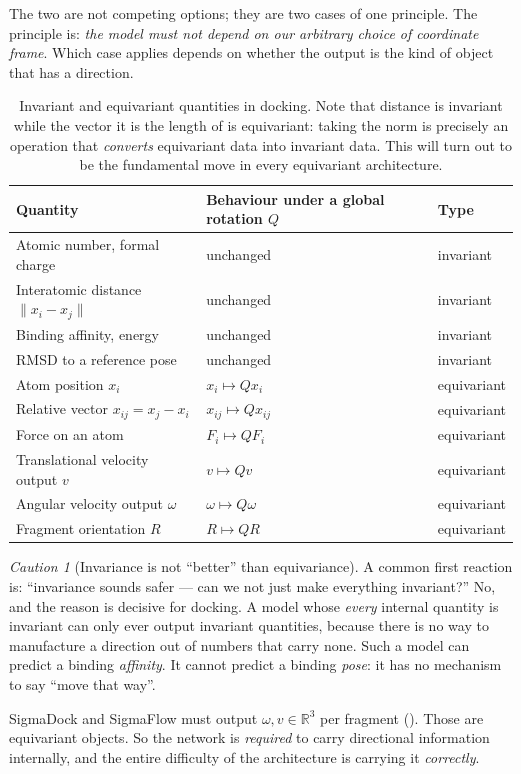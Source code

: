 \documentclass[11pt,a4paper]{report}
\theoremstyle{definition}
\theoremstyle{remark}
\newtheorem{caution}[caution]{Caution}
\newcommand{\RR}{\mathbb R}
\begin{document}
The two are not competing options; they are two cases of one principle. The
principle is: \emph{the model must not depend on our arbitrary choice of
coordinate frame}. Which case applies depends on whether the output is the
kind of object that has a direction.

\begin{table}[h]
\centering
\begin{tabular}{lll}
\toprule
Quantity & Behaviour under a global rotation $Q$ & Type \\
\midrule
Atomic number, formal charge & unchanged & invariant \\
Interatomic distance $\|x_i-x_j\|$ & unchanged & invariant \\
Binding affinity, energy & unchanged & invariant \\
RMSD to a reference pose & unchanged & invariant \\
\midrule
Atom position $x_i$ & $x_i\mapsto Qx_i$ & equivariant \\
Relative vector $x_{ij}=x_j-x_i$ & $x_{ij}\mapsto Qx_{ij}$ & equivariant \\
Force on an atom & $F_i\mapsto QF_i$ & equivariant \\
Translational velocity output $v$ & $v\mapsto Qv$ & equivariant \\
Angular velocity output $\omega$ & $\omega\mapsto Q\omega$ & equivariant \\
Fragment orientation $R$ & $R\mapsto QR$ & equivariant \\
\bottomrule
\end{tabular}
\caption{Invariant and equivariant quantities in docking. Note that
distance is invariant while the vector it is the length of is equivariant:
taking the norm is precisely an operation that \emph{converts} equivariant
data into invariant data. This will turn out to be the fundamental move in
every equivariant architecture.}
\label{tab:inv-equi-examples}
\end{table}

\begin{caution}[Invariance is not ``better'' than equivariance]
\label{caution:inv-not-better}
A common first reaction is: ``invariance sounds safer --- can we not just
make everything invariant?'' No, and the reason is decisive for docking. A
model whose \emph{every} internal quantity is invariant can only ever output
invariant quantities, because there is no way to manufacture a direction out
of numbers that carry none. Such a model can predict a binding
\emph{affinity}. It cannot predict a binding \emph{pose}: it has no
mechanism to say ``move that way''.

SigmaDock and SigmaFlow must output $\omega,v\in\RR^3$ per fragment
(). Those are equivariant objects. So the
network is \emph{required} to carry directional information internally, and
the entire difficulty of the architecture is carrying it \emph{correctly}.
\end{caution}
\end{document}
